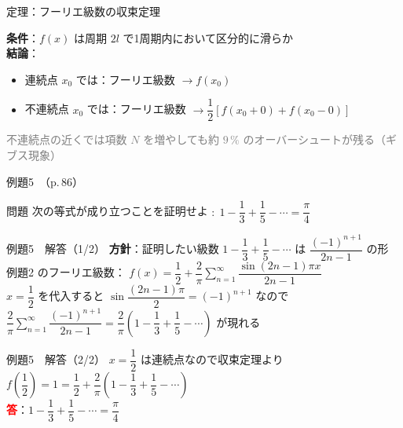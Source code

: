 \documentclass[professionalfonts]{beamer}
\begin{document}
\begin{frame}{定理：フーリエ級数の収束定理}
  \begin{block}{}
  \textbf{条件}：$f(x)$ は周期 $2l$ で1周期内において区分的に滑らか\\[6pt]
  \textbf{結論}：
  \begin{itemize}
    \item 連続点 $x_{0}$ では：フーリエ級数 $\to f(x_{0})$
    \item 不連続点 $x_{0}$ では：フーリエ級数 $\to \dfrac{1}{2}[f(x_{0}+0) + f(x_{0}-0)]$
  \end{itemize}
  \end{block}
  {\footnotesize \textcolor{gray}{不連続点の近くでは項数 $N$ を増やしても約 $9\,\%$ のオーバーシュートが残る（ギブス現象）}}
\end{frame}

\begin{frame}{例題5　（p.\,86）}
  \begin{exampleblock}{問題}
    次の等式が成り立つことを証明せよ $:\; 1 - \dfrac{1}{3} + \dfrac{1}{5} - \cdots = \dfrac{\pi}{4}$\\[2pt]
  \end{exampleblock}
\end{frame}

\begin{frame}{例題5　解答（1/2）}
  \textbf{方針}：証明したい級数 $1-\dfrac{1}{3}+\dfrac{1}{5}-\cdots$ は $\dfrac{(-1)^{n+1}}{2n-1}$ の形\\[6pt]
  例題2 のフーリエ級数：
  $f(x) = \dfrac{1}{2} + \dfrac{2}{\pi}\displaystyle\sum_{n=1}^{\infty}\dfrac{\sin(2n-1)\pi x}{2n-1}$\\[6pt]
  $x = \dfrac{1}{2}$ を代入すると $\sin\dfrac{(2n-1)\pi}{2} = (-1)^{n+1}$ なので\\[4pt]
  $\dfrac{2}{\pi}\displaystyle\sum_{n=1}^{\infty}\dfrac{(-1)^{n+1}}{2n-1} = \dfrac{2}{\pi}\!\left(1-\dfrac{1}{3}+\dfrac{1}{5}-\cdots\right)$ が現れる
\end{frame}

\begin{frame}{例題5　解答（2/2）}
  $x = \dfrac{1}{2}$ は連続点なので収束定理より\\[4pt]
  $f\!\left(\dfrac{1}{2}\right) = 1 = \dfrac{1}{2} + \dfrac{2}{\pi}\!\left(1 - \dfrac{1}{3} + \dfrac{1}{5} - \cdots\right)$
  \\[8pt]\textcolor{red}{\textbf{答}}：$1 - \dfrac{1}{3} + \dfrac{1}{5} - \cdots = \dfrac{\pi}{4}$
\end{frame}
\end{document}
